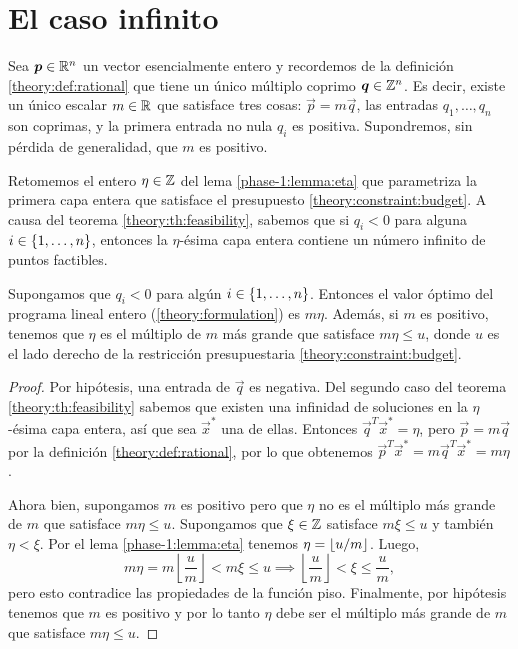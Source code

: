 \chapter{El caso infinito}
\label{chap:inf}
\noindent
Sea $\boldsymbol{p} \in \mathbb{R}^n$ un vector esencialmente entero y recordemos de la definición
\ref{theory:def:rational} que tiene un único múltiplo coprimo $\boldsymbol{q} \in \mathbb{Z}^n$. Es decir, existe
un único escalar $m \in \mathbb{R}$ que satisface tres cosas: $\vec{p} = m\vec{q}$, las entradas $q_1,
\ldots, q_n$ son coprimas, y la primera entrada no nula $q_i$ es positiva. Supondremos, sin pérdida
de generalidad, que $m$ es positivo.

Retomemos el entero $\eta \in \mathbb{Z}$ del lema \ref{phase-1:lemma:eta} que parametriza la primera capa
entera que satisface el presupuesto \eqref{theory:constraint:budget}. A causa del teorema
\ref{theory:th:feasibility}, sabemos que si $q_i < 0$ para alguna $i \in \lbrace 1, \ldots, n \rbrace$,
entonces la $\eta$-ésima capa entera contiene un número infinito de puntos factibles.

\begin{corollary}
	\label{cor:inf:obj}
	Supongamos que $q_i < 0$ para algún $i \in \lbrace 1, \ldots, n \rbrace$. Entonces el valor óptimo del
	programa lineal entero (\ref{theory:formulation}) es $m\eta$. Además, si $m$ es positivo,
	tenemos que $\eta$ es el múltiplo de $m$ más grande que satisface $m\eta \leq u$, donde $u$ es
	el lado derecho de la restricción presupuestaria \eqref{theory:constraint:budget}.
\end{corollary}
\begin{proof}
	Por hipótesis, una entrada de $\vec{q}$ es negativa. Del segundo caso del teorema
	\ref{theory:th:feasibility} sabemos que existen una infinidad de soluciones en la $\eta$-ésima
	capa entera, así que sea $\vec{x}^*$ una de ellas. Entonces $\vec{q}^T\vec{x}^* = \eta$, pero
	$\vec{p} = m\vec{q}$ por la definición \ref{theory:def:rational}, por lo que obtenemos
	$\vec{p}^T\vec{x}^* = m\vec{q}^T\vec{x}^* = m\eta$.

	Ahora bien, supongamos $m$ es positivo pero que $\eta$ no es el múltiplo más grande de $m$ que
	satisface $m\eta \leq u$. Supongamos que $\xi \in \mathbb{Z}$ satisface $m\xi \leq u$ y también $\eta <
	\xi$. Por el lema \ref{phase-1:lemma:eta} tenemos $\eta = \left\lfloor u/m \right\rfloor$. Luego,
	\begin{equation*}
		m\eta = m\left\lfloor \frac{u}{m} \right\rfloor < m\xi \leq u
		\implies \left\lfloor \frac{u}{m} \right\rfloor < \xi \leq \frac{u}{m},
	\end{equation*}
	pero esto contradice las propiedades de la función piso. Finalmente, por hipótesis tenemos que
	$m$ es positivo y por lo tanto $\eta$ debe ser el múltiplo más grande de $m$ que satisface
	$m\eta \leq u$.
\end{proof}

